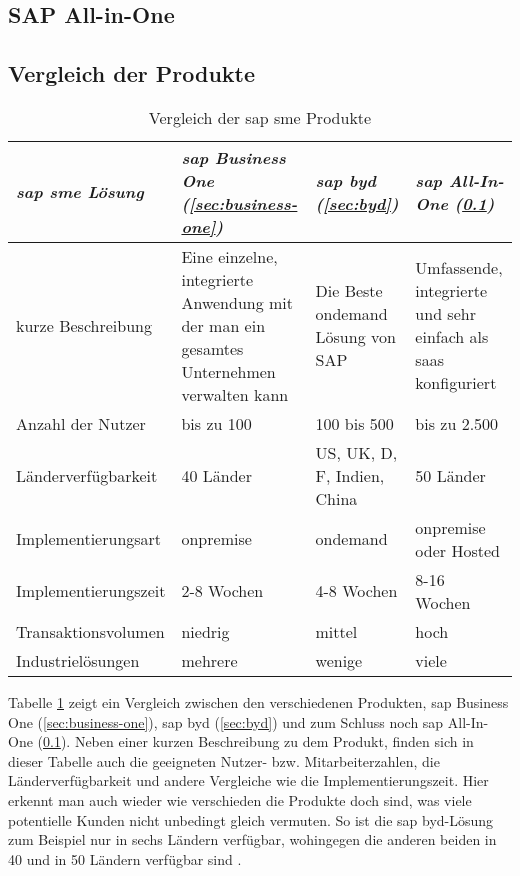 \subsection{SAP All-in-One}
\label{sec:allinone}

\subsection{Vergleich der Produkte}
\begin{table}[h]
\begin{center}
\begin{tabular}{p{3.5cm}||p{3cm}|p{3cm}|p{3cm}}
  \emph{\gls{sap} \gls{sme} Lösung} & \emph{\gls{sap} Business One (\ref{sec:business-one})} & \emph{\gls{sap} \gls{byd} (\ref{sec:byd})} & \emph{\gls{sap} All-In-One (\ref{sec:allinone})}\\	
  \hline
  kurze Beschreibung & Eine einzelne, integrierte Anwendung mit der man ein gesamtes Unternehmen verwalten kann & Die Beste \gls{ondemand} Lösung von SAP & Umfassende, integrierte und sehr einfach als \gls{saas} konfiguriert\\
  \hline
  Anzahl der Nutzer & bis zu 100 & 100 bis 500 &  bis zu 2.500\\
  \hline
  Länderverfügbarkeit & 40 Länder & US, UK, D, F, Indien, China & 50 Länder\\
  \hline	
  Implementierungsart & \gls{onpremise} & \gls{ondemand} & \gls{onpremise} oder Hosted\\
  \hline	
  Implementierungszeit & 2-8 Wochen & 4-8 Wochen & 8-16 Wochen\\
  \hline	
  Transaktionsvolumen & niedrig & mittel & hoch\\
  \hline	
  Industrielösungen & mehrere & wenige & viele\\
  \hline				
\end{tabular}
\end{center}
\caption{Vergleich der \gls{sap} \gls{sme} Produkte} 
\label{tab:smevergleich}
\end{table}

Tabelle \ref{tab:smevergleich} zeigt ein Vergleich zwischen den verschiedenen Produkten, \gls{sap} Business One (\ref{sec:business-one}), \gls{sap} \gls{byd} (\ref{sec:byd}) und zum Schluss noch \gls{sap} All-In-One (\ref{sec:allinone}). Neben einer kurzen Beschreibung zu dem Produkt, finden sich in dieser Tabelle auch die geeigneten Nutzer- bzw. Mitarbeiterzahlen, die Länderverfügbarkeit und andere Vergleiche wie die Implementierungszeit. Hier erkennt man auch wieder wie verschieden die Produkte doch sind, was viele potentielle Kunden nicht unbedingt gleich vermuten. So ist die \gls{sap} \gls{byd}-Lösung zum Beispiel nur in sechs Ländern verfügbar, wohingegen die anderen beiden in 40 und in 50 Ländern verfügbar sind \cite{SAPin24hrs}.